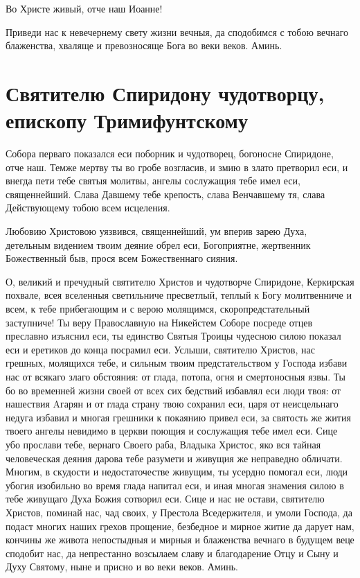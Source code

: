 \begin{mymulticols}
Во Христе живый, отче наш Иоанне! 

Приведи нас к невечернему свету жизни вечныя, да сподобимся с тобою вечнаго блаженства, хваляще и превозносяще Бога во веки веков. Аминь.

\end{mymulticols}

\section{Святителю Спиридону чудотворцу, епископу Тримифунтскому}\begin{mymulticols}


Собора перваго показался еси поборник и чудотворец, богоносне Спиридоне, отче наш. Темже мертву ты во гробе возгласив, и змию в злато претворил еси, и внегда пети тебе святыя молитвы, ангелы сослужащия тебе имел еси, священнейший. Слава Давшему тебе крепость, слава Венчавшему тя, слава Действующему тобою всем исцеления.


Любовию Христовою уязвився, священнейший, ум вперив зарею Духа, детельным видением твоим деяние обрел еси, Богоприятне, жертвенник Божественный быв, прося всем Божественнаго сияния.


О, великий и пречудный святителю Христов и чудотворче Спиридоне, Керкирская похвале, всея вселенныя светильниче пресветлый, теплый к Богу молитвенниче и всем, к тебе прибегающим и с верою молящимся, скоропредстательный заступниче! Ты веру Православную на Никейстем Соборе посреде отцев преславно изъяснил еси, ты единство Святыя Троицы чудесною силою показал еси и еретиков до конца посрамил еси. Услыши, святителю Христов, нас грешных, молящихся тебе, и сильным твоим предстательством у Господа избави нас от всякаго злаго обстояния: от глада, потопа, огня и смертоносныя язвы. Ты бо во временней жизни своей от всех сих бедствий избавлял еси люди твоя: от нашествия Aгарян и от глада страну твою сохранил еси, царя от неисцельнаго недуга избавил и многая грешники к покаянию привел еси, за святость же жития твоего ангелы невидимо в церкви поющия и сослужащия тебе имел еси. Сице убо прослави тебе, вернаго Своего раба, Владыка Христос, яко вся тайная человеческая деяния дарова тебе разумети и живущия же неправедно обличати. Многим, в скудости и недостаточестве живущим, ты усердно помогал еси, люди убогия изобильно во время глада напитал еси, и иная многая знамения силою в тебе живущаго Духа Божия сотворил еси. Сице и нас не остави, святителю Христов, поминай нас, чад своих, у Престола Вседержителя, и умоли Господа, да подаст многих наших грехов прощение, безбедное и мирное житие да дарует нам, кончины же живота непостыдныя и мирныя и блаженства вечнаго в будущем веце сподобит нас, да непрестанно возсылаем славу и благодарение Отцу и Сыну и Духу Святому, ныне и присно и во веки веков. Аминь.

\end{mymulticols}


